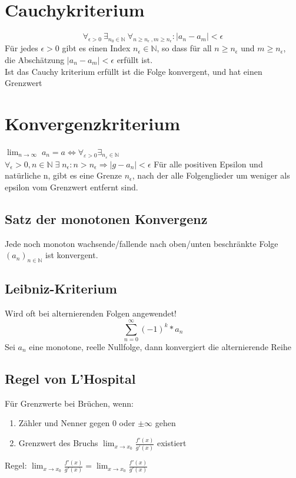 \documentclass[12pt,a4paper]{article}
\begin{document}
\section{Cauchykriterium}
	$$\forall_{\epsilon>0}~\exists_{n_{0}\in\mathbb{N}} ~\forall_{n \geq n_{\epsilon}~, m \geq n_{\epsilon}}: | a_{n}-a_{m} | < \epsilon$$
	Für jedes $\epsilon > 0$ gibt es einen Index $n_{\epsilon} \in \mathbb{N}$, so dass für all $n\geq n_{\epsilon}$ und $m\geq n_{\epsilon}$,\\
	die Abschätzung $| a_{n}-a_{m} | < \epsilon$ erfüllt ist.\\
	Ist das Cauchy kriterium erfüllt ist die Folge konvergent, und hat einen Grenzwert

\section{Konvergenzkriterium}
	$\lim_{n \to \infty} \; a_n = a \Leftrightarrow \forall_{\varepsilon > 0} \exists _{n_\varepsilon \in  \mathbb{N}}$\\
	$\forall_\epsilon > 0, n \in \mathbb{N}\; \exists\; n_\epsilon: n > n_\epsilon \Rightarrow |g-a_n| < \epsilon $
	Für alle positiven Epsilon und natürliche n, gibt es eine Grenze $n_\epsilon $, nach der alle Folgenglieder um weniger als epsilon vom Grenzwert entfernt sind.\\ 

	\subsection{Satz der monotonen Konvergenz}
		Jede noch monoton wachsende/fallende nach oben/unten beschränkte Folge $(a_n)_{n \in \mathbb{N}}$ ist konvergent.\\

	\subsection{Leibniz-Kriterium}
		Wird oft bei alternierenden Folgen angewendet!\newline
		$$\sum^{\infty}_{n=0}{(-1)^k *a_n}$$
		Sei $a_n$ eine monotone, reelle Nullfolge, dann konvergiert die alternierende Reihe

	\subsection{Regel von L'Hospital}
		Für Grenzwerte bei Brüchen, wenn:
		\begin{enumerate}
			\item Zähler und Nenner gegen 0 oder $\pm \infty$ gehen
			\item Grenzwert des Bruchs $\lim_{x \to x_0} \frac{f'(x)}{g'(x)}$ existiert
		\end{enumerate}
		Regel: $\lim_{x \to x_0} \frac{f'(x)}{g'(x)} = \lim_{x \to x_0} \frac{f'(x)}{g'(x)}$
\end{document}
